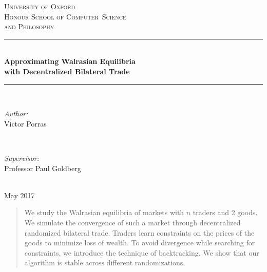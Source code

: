 \documentclass[12pt,a4paper,titlepage]{article}
\begin{document}
\begin{titlepage}

\newcommand{\HRule}{\rule{\linewidth}{0.5mm}} %

\center %
 
\textsc{\LARGE University of Oxford}\\[1.5cm] %
\textsc{\LARGE Honour School of Computer~Science \\[0.2cm] and Philosophy}\\[0.5cm] %

\HRule \\[0.4cm]
\textbf{\LARGE Approximating Walrasian Equilibria} \\[0.3cm]
\textbf{\LARGE with Decentralized Bilateral Trade}\\[0.1cm]
\HRule \\[2cm]
 
\begin{minipage}{0.45\textwidth}
\begin{flushleft} \Large
\emph{Author:}\\
Victor Porras %
\end{flushleft}
\end{minipage}
~
\begin{minipage}{0.45\textwidth}
\begin{flushright} \Large
\emph{Supervisor:} \\
Professor Paul Goldberg %
\end{flushright}
\end{minipage}\\[2cm]

{\Large {May 2017}}\\[2cm]

 

\vfill %

\end{titlepage}

\begin{abstract}
  We study the Walrasian equilibria of markets with $n$ traders and 2 goods.
  We simulate the convergence of such a market through decentralized randomized bilateral trade.
  Traders learn constraints on the prices of the goods to minimize loss of wealth.
  To avoid divergence while searching for constraints, we introduce the technique of backtracking.
  We show that our algorithm is stable across different randomizations.
\end{abstract}
\end{document}
